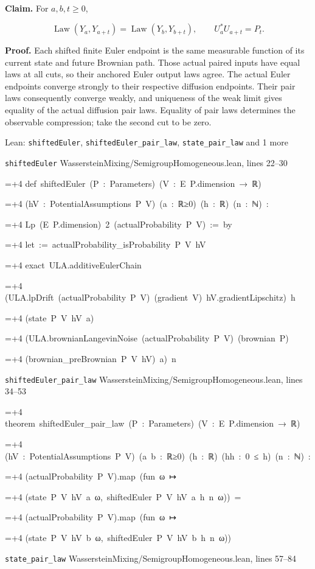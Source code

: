 \documentclass[11pt,a4paper]{report}
\newlength{\leancharwidth}
\newenvironment{leancode}{\par\smallskip\begingroup\ttfamily\footnotesize\raggedright
  \settowidth{\leancharwidth}{M}\setlength{\parskip}{0pt}\setlength{\parindent}{0pt}
  \frenchspacing}{\par\endgroup\smallskip}
\newcommand{\leanline}[2]{\hangindent=\dimexpr#1\leancharwidth+4\leancharwidth\relax
  \hangafter=1\noindent\hspace*{#1\leancharwidth}#2\par}
\newcommand{\leansource}[1]{\par{\footnotesize\color{leanmuted}#1}\par}
\begin{document}
\textbf{Claim.} For \(a,b,t\ge0\),

\[\operatorname{Law}(Y_a,Y_{a+t})=\operatorname{Law}(Y_b,Y_{b+t}),\qquad U_a^*U_{a+t}=P_t.\]

\textbf{Proof.} Each shifted finite Euler endpoint is the same measurable function of its current state and future Brownian path. Those actual paired inputs have equal laws at all cuts, so their anchored Euler output laws agree. The actual Euler endpoints converge strongly to their respective diffusion endpoints. Their pair laws consequently converge weakly, and uniqueness of the weak limit gives equality of the actual diffusion pair laws. Equality of pair laws determines the observable compression; take the second cut to be zero.

\begin{leanbox}{Lean: \texttt{shiftedEuler}, \texttt{shiftedEuler\_\allowbreak{}pair\_\allowbreak{}law}, \texttt{state\_\allowbreak{}pair\_\allowbreak{}law} and 1 more}
\leansource{\texttt{shiftedEuler} \quad WassersteinMixing/\allowbreak{}SemigroupHomogeneous.lean, lines 22–30}
\begin{leancode}
\leanline{0}{def\ shiftedEuler\ (P\ :\ Parameters)\ (V\ :\ E\ P.dimension\ →\ ℝ)}
\leanline{4}{(hV\ :\ PotentialAssumptions\ P\ V)\ (a\ :\ ℝ≥0)\ (h\ :\ ℝ)\ (n\ :\ ℕ)\ :}
\leanline{4}{Lp\ (E\ P.dimension)\ 2\ (actualProbability\ P\ V)\ :=\ by}
\leanline{2}{let\ :=\ actualProbability\_isProbability\ P\ V\ hV}
\leanline{2}{exact\ ULA.additiveEulerChain}
\leanline{4}{(ULA.lpDrift\ (actualProbability\ P\ V)\ (gradient\ V)\ hV.gradientLipschitz)\ h}
\leanline{4}{(state\ P\ V\ hV\ a)}
\leanline{4}{(ULA.brownianLangevinNoise\ (actualProbability\ P\ V)\ (brownian\ P)}
\leanline{6}{(brownian\_preBrownian\ P\ V\ hV)\ a)\ n}
\end{leancode}
\leansource{\texttt{shiftedEuler\_\allowbreak{}pair\_\allowbreak{}law} \quad WassersteinMixing/\allowbreak{}SemigroupHomogeneous.lean, lines 34–53}
\begin{leancode}
\leanline{0}{theorem\ shiftedEuler\_pair\_law\ (P\ :\ Parameters)\ (V\ :\ E\ P.dimension\ →\ ℝ)}
\leanline{4}{(hV\ :\ PotentialAssumptions\ P\ V)\ (a\ b\ :\ ℝ≥0)\ (h\ :\ ℝ)\ (hh\ :\ 0\ ≤\ h)\ (n\ :\ ℕ)\ :}
\leanline{4}{(actualProbability\ P\ V).map\ (fun\ ω\ ↦}
\leanline{6}{(state\ P\ V\ hV\ a\ ω,\ shiftedEuler\ P\ V\ hV\ a\ h\ n\ ω))\ =}
\leanline{4}{(actualProbability\ P\ V).map\ (fun\ ω\ ↦}
\leanline{6}{(state\ P\ V\ hV\ b\ ω,\ shiftedEuler\ P\ V\ hV\ b\ h\ n\ ω))}
\end{leancode}
\leansource{\texttt{state\_\allowbreak{}pair\_\allowbreak{}law} \quad WassersteinMixing/\allowbreak{}SemigroupHomogeneous.lean, lines 57–84}

\end{leanbox}
\end{document}
